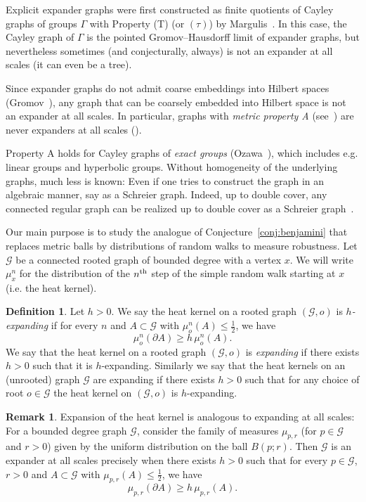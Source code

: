 \documentclass[10pt]{amsart}
\theoremstyle{definition}\newtheorem{defi}[theo]{Definition}\newtheorem{rema}[theo]{Remark}\newtheorem{exam}[theo]{Example}\newtheorem{exem}[theo]{Example}\newtheorem{nota}[theo]{Notation}
\newcommand{\calG}{\mathcal{G}}
\begin{document}
Explicit expander graphs were first constructed as finite quotients of Cayley graphs of groups $\Gamma$ with Property (T) (or $(\tau)$) by Margulis~\cite{margulis_expander}. In this case, the Cayley graph of $\Gamma$ is the pointed Gromov--Hausdorff limit of expander graphs, but nevertheless sometimes (and conjecturally, always) is not an expander at all scales (it can even be a tree).

Since expander graphs do not admit coarse embeddings into Hilbert spaces (Gromov~\cite{gromov2003random}), any graph that can be coarsely embedded into Hilbert space is not an expander at all scales. In particular, graphs with \emph{metric property A} (see~\cite{NowakAMM}) are never expanders at all scales (\cite{Yu00}).

Property A holds for Cayley graphs of \emph{exact groups} (Ozawa~\cite{OzawaICM}), which includes e.g. linear groups and hyperbolic groups. Without homogeneity of the underlying graphs, much less is known: Even if one tries to construct the graph in an algebraic manner, say as a Schreier graph. Indeed, up to double cover, any connected regular graph can be realized up to double cover as a Schreier graph~\cite{Leemann22}.

Our main purpose is to study the analogue of Conjecture~\ref{conj:benjamini} that replaces metric balls by distributions of random walks to measure robustness. Let $\calG$ be a connected rooted graph of bounded degree with a vertex $x$. We will write $\mu^n_x$ for the distribution of the $n^{\rm th}$ step of the simple random walk starting at $x$ (i.e. the heat kernel).

\begin{defi}\label{dfn:expanding_walks}
Let $h>0$. We say the heat kernel on a rooted graph $(\calG,o)$ is $h$\emph{-expanding} if for every $n$ and $A\subset \calG$ with $\mu^n_o(A)\leq \frac{1}{2}$, we have
\begin{equation}\label{eq:expansion}
\mu^n_o(\partial A)\geq h \, \mu^n_o(A).
\end{equation}
We say that the heat kernel on a rooted graph $(\calG,o)$ is \emph{expanding} if there exists $h>0$ such that it is $h$-expanding. Similarly we say that the heat kernels on an (unrooted) graph $\calG$ are expanding if there exists $h>0$ such that for any choice of root $o\in \calG$ the heat kernel on $(\calG,o)$ is $h$-expanding.
\end{defi}


\begin{rema}\label{rmk:walks_vs_benjamini}
Expansion of the heat kernel is analogous to expanding at all scales: For a bounded degree graph $\calG$, consider the family of measures $\mu_{p,r}$ (for $p\in \calG$ and $r>0$) given by the uniform distribution on the ball $B(p;r)$. Then $\calG$ is an expander at all scales precisely when there exists $h>0$ such that for every $p\in \calG$, $r>0$ and $A\subset \calG$ with $\mu_{p,r}(A)\leq \frac{1}{2}$, we have
\[
\mu_{p,r}(\partial A)\geq h \, \mu_{p,r}(A).
\]
\end{rema}
\end{document}
